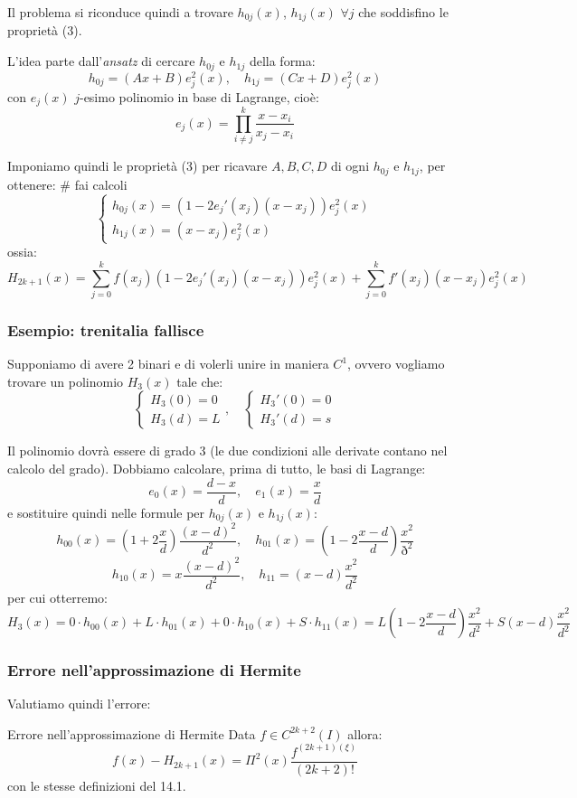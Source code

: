 \documentclass[a4paper,11pt]{article}
\begin{document}
Il problema si riconduce quindi a trovare $h_{0j}(x)$, $h_{1j}(x)$ $\forall j$ che soddisfino le proprietà (3).

L'idea parte dall'\textit{ansatz} di cercare $h_{0j}$ e $h_{1j}$ della forma:
$$
h_{0j} = (Ax + B) e_j^2(x), \quad h_{1j} = (Cx + D) e_j^2(x)
$$
con $e_j(x)$ $j$-esimo polinomio in base di Lagrange, cioè:
$$
e_j(x) = \prod_{i \neq j}^k \frac{x - x_i}{x_j - x_i}
$$

Imponiamo quindi le proprietà (3) per ricavare $A, B, C, D$ di ogni $h_{0j}$ e $h_{1j}$, per ottenere: # fai calcoli
\[
	\begin{cases}
		h_{0j}(x) = \left( 1 - 2 e_j'(x_j) (x - x_j) \right) e_j^2(x) \\
		h_{1j}(x) = (x - x_j) e^2_j(x)
	\end{cases}
\]
ossia:
$$
H_{2k + 1}(x) = \sum_{j = 0}^k f(x_j) \left( 1 - 2 e_j'(x_j)(x - x_j) \right) e_j^2(x) + \sum_{j = 0}^k f'(x_j) (x - x_j) e_j^2(x)
$$

\subsubsection{Esempio: trenitalia fallisce}
Supponiamo di avere 2 binari e di volerli unire in maniera $C^1$, ovvero vogliamo trovare un polinomio $H_3(x)$ tale che:
\[
	\begin{cases}
		H_3(0) = 0 \\
		H_3(d) = L
	\end{cases}, \quad
	\begin{cases}
		H_3'(0) = 0 \\
		H_3'(d) = s
	\end{cases} 
\]

Il polinomio dovrà essere di grado 3 (le due condizioni alle derivate contano nel calcolo del grado).
Dobbiamo calcolare, prima di tutto, le basi di Lagrange:
$$
e_0(x) = \frac{d - x}{d}, \quad e_1(x) = \frac{x}{d}
$$
e sostituire quindi nelle formule per $h_{0j}(x)$ e $h_{1j}(x)$:
$$
h_{00}(x) = \left( 1 + 2\frac{x}{d} \right) \frac{(x - d)^2}{d^2}, \quad h_{01}(x) = \left( 1 - 2 \frac{x - d}{d} \right) \frac{x^2}{ð^2}
$$
$$
h_{10}(x) = x \frac{(x - d)^2}{d^2}, \quad h_{11} = (x - d) \frac{x^2}{d^2}
$$
per cui otterremo:
$$
H_3(x) = 0 \cdot h_{00}(x) + L \cdot h_{01}(x) + 0 \cdot h_{10}(x) + S \cdot h_{11}(x) = L \left( 1 - 2 \frac{x - d}{d} \right) \frac{x^2}{d^2} + S (x - d) \frac{x^2}{d^2}
$$

\subsubsection{Errore nell'approssimazione di Hermite}
Valutiamo quindi l'errore:
\begin{theorem}{Errore nell'approssimazione di Hermite}
	Data $f \in C^{2k + 2}(I)$ allora:
$$
f(x) - H_{2k + 1}(x) = \Pi^2 (x) \frac{f^{(2k + 1)(\xi)}}{(2k + 2)!}
$$
con le stesse definizioni del 14.1.
\end{theorem}
\end{document}
